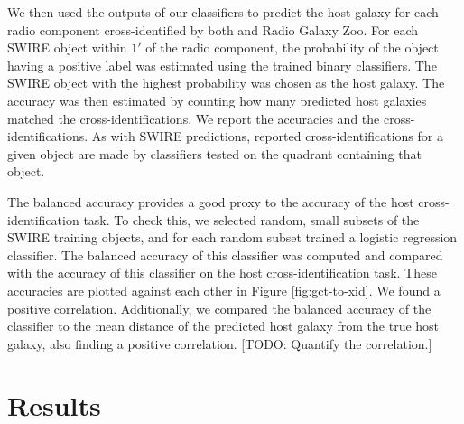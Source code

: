 \documentclass[fleqn,usenatbib,usedcolumn]{mnras}
\begin{document}
    We then used the outputs of our classifiers to predict the host galaxy
    for each radio component cross-identified by both \citet{norris06}
    and Radio Galaxy Zoo. For each SWIRE object within $1'$ of the radio
    component, the probability of the object having a positive label was
    estimated using the trained binary classifiers. The SWIRE object with
    the highest probability was chosen as the host galaxy. The accuracy was
    then estimated by counting how many predicted host galaxies matched the
    \citet{norris06} cross-identifications. We report the accuracies and the
    cross-identifications. As with SWIRE predictions, reported
    cross-identifications for a given object are made by classifiers tested
    on the quadrant containing that object.

    The balanced accuracy provides a good proxy to the accuracy of the host
    cross-identification task. To check this, we selected random, small
    subsets of the SWIRE training objects, and for each random subset trained
    a logistic regression classifier. The balanced accuracy of this classifier
    was computed and compared with the accuracy of this classifier on the host
    cross-identification task. These accuracies are plotted against each other
    in Figure \ref{fig:gct-to-xid}. We found a positive correlation.
    Additionally, we compared the balanced accuracy of the classifier to the
    mean distance of the predicted host galaxy from the true host galaxy, also
    finding a positive correlation. [TODO: Quantify the correlation.]

\section{Results}\label{results}
\end{document}
